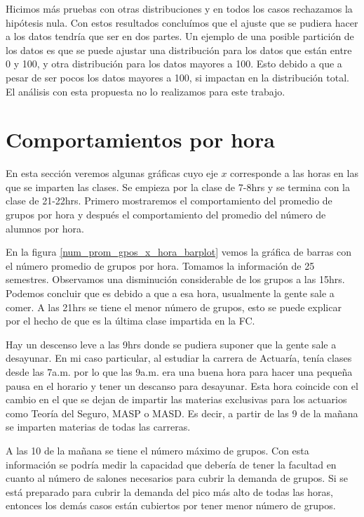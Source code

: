 Hicimos más pruebas con otras distribuciones y en todos los casos rechazamos la hipótesis nula. Con estos resultados concluímos que el ajuste que se pudiera hacer a los datos tendría que ser en dos partes. Un ejemplo de una posible partición de los datos es que se puede ajustar una distribución para los datos que están entre 0 y 100, y otra distribución para los datos mayores a 100. Esto debido a que a pesar de ser pocos los datos mayores a 100, si impactan en la distribución total. El análisis con esta propuesta no lo realizamos para este trabajo.


\section{Comportamientos por hora}

En esta sección veremos algunas gráficas cuyo eje $x$ corresponde a las horas en las que se imparten las clases. Se empieza por la clase de 7-8hrs y se termina con la clase de 21-22hrs. Primero mostraremos el comportamiento del promedio de grupos por hora y después el comportamiento del promedio del número de alumnos por hora.

En la figura \ref{num_prom_gpos_x_hora_barplot} vemos la gráfica de barras con el número promedio de grupos por hora. Tomamos la información de 25 semestres. Observamos una disminución considerable de los grupos a las 15hrs. Podemos concluir que es debido a que a esa hora, usualmente la gente sale a comer. A las 21hrs se tiene el menor número de grupos, esto se puede explicar por el hecho de que es la última clase impartida en la FC.

Hay un descenso leve a las 9hrs donde se pudiera suponer que la gente sale a desayunar. En mi caso particular, al estudiar la carrera de Actuaría, tenía clases desde las 7a.m. por lo que las 9a.m. era una buena hora para hacer una pequeña pausa en el horario y tener un descanso para desayunar. Esta hora coincide con el cambio en el que se dejan de impartir las materias exclusivas para los actuarios como Teoría del Seguro, MASP o MASD. Es decir, a partir de las 9 de la mañana se imparten materias de todas las carreras.

A las 10 de la mañana se tiene el número máximo de grupos. Con esta información se podría medir la capacidad que debería de tener la facultad en cuanto al número de salones necesarios para cubrir la demanda de grupos. Si se está preparado para cubrir la demanda del pico más alto de todas las horas, entonces los demás casos están cubiertos por tener menor número de grupos.


